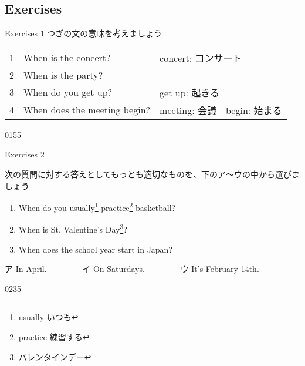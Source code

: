 \documentclass[aspectratio=169,xcolor={dvipsnames,table}]{beamer}
\begin{document}
\subsection{Exercises}
\begin{frame}[plain]{Exercises 1}
つぎの文の意味を考えましょう

\begin{tabular}{rll}
1& When is the concert? &{\scriptsize concert: コンサート} \\
2& When is the party?& \\
3& When do you get up? & {\scriptsize get up: 起きる}\\
4& When does the meeting begin?&{\scriptsize meeting: 会議　begin: 始まる} \\
\end{tabular}


\mbox{}\hfill{\tiny 0155}\,{\scriptsize {}}

\end{frame}

\begin{frame}[plain]{Exercises 2}

 {\small 次の質問に対する答えとしてもっとも適切なものを、下のア～ウの中から選びましょう}

\begin{enumerate}
 \item When do you usually\footnote{usually  いつも} practice\footnote{practice  練習する} basketball?\hspace{10pt}\hspace{21pt}
 \item When is St. Valentine's Day\footnote{バレンタインデー}?\hspace{80pt}\hspace{12pt}
 \item When does the school year start in Japan?\hspace{15pt}\hspace{50pt}
\end{enumerate}

\bigskip

\begin{tcolorbox}
\centering
ア In April.~~~~~~~~%
イ On Saturdays.~~~~~~~~%
ウ It's February 14th. 
\end{tcolorbox}

%
\mbox{}\hfill{\tiny 0235}\,{\scriptsize {}}


\end{frame}
\end{document}
